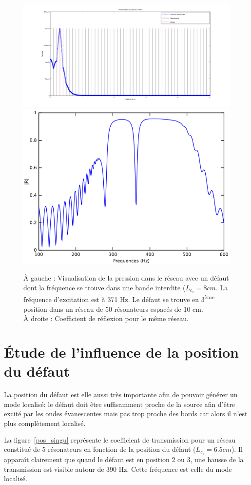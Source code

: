 \begin{figure}[!h]
\centering
\includegraphics[width=0.6 \textwidth]{images_chp2/visu_pression_favo2.png}
\includegraphics[width=0.35 \textwidth]{images_chp2/reflexion_50HR16_pos3_8cm.png}
\caption{\label{defaut_dansb} À gauche : Visualisation de la pression dans le réseau avec un défaut dont la fréquence se trouve dans une bande interdite ($L_{c_{s}}=8cm$. La fréquence d'excitation est à 371 Hz. Le défaut se trouve en 3\textsuperscript{ème} position dans un réseau de 50 résonateurs espacés de 10 cm.\\ À droite : Coefficient de réflexion pour le même réseau.}
\end{figure}



\section{Étude de l'influence de la position du défaut}
La position du défaut est elle aussi très importante afin de pouvoir générer un mode localisé: le défaut doit être suffisamment proche de la source afin d'être excité par les ondes évanescentes mais pas trop proche des bords car alors il n'est plus complètement localisé.

La figure~\ref{pos_singu} représente le coefficient de transmission pour un réseau constitué de 5 résonateurs en fonction de la position du défaut ($L_{c_{s}}=6.5 cm$). Il apparaît clairement que quand le défaut est en position 2 ou 3, une hausse de la transmission est visible autour de 390 Hz. Cette fréquence est celle du mode localisé. 

